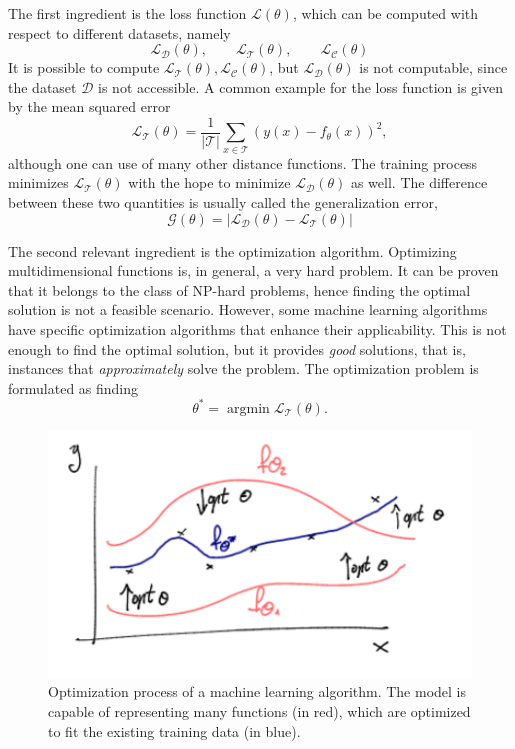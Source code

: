 \documentclass[]{report}
\begin{document}
The first ingredient is the loss function $\mathcal L(\theta)$, which can be computed with respect to different datasets, namely
\begin{equation}
    \mathcal L_{\mathcal D}(\theta), \qquad \mathcal L_{\mathcal T}(\theta), \qquad \mathcal L_{\mathcal C}(\theta)
\end{equation}
It is possible to compute $\mathcal L_{\mathcal T}(\theta), \mathcal L_{\mathcal C}(\theta)$, but $\mathcal L_{\mathcal D}(\theta)$ is not computable, since the dataset $\mathcal D$ is not accessible. A common example for the loss function is given by the mean squared error
\begin{equation}
    \mathcal L_{\mathcal T}(\theta) = \frac{1}{\vert \mathcal T \vert} \sum_{x \in \mathcal T} (y(x) - f_\theta(x))^2, 
\end{equation}
although one can use of many other distance functions. The training process minimizes $\mathcal L_{\mathcal T}(\theta)$ with the hope to minimize $\mathcal L_{\mathcal D}(\theta)$ as well. The difference between these two quantities is usually called the generalization error, 
\begin{equation}
    \mathcal G(\theta) = \left\vert \mathcal L_{\mathcal D}(\theta) - \mathcal L_{\mathcal T}(\theta) \right\vert
\end{equation}

The second relevant ingredient is the optimization algorithm. Optimizing multidimensional functions is, in general, a very hard problem. It can be proven that it belongs to the class of NP-hard problems, hence finding the optimal solution is not a feasible scenario. However, some machine learning algorithms have specific optimization algorithms that enhance their applicability. This is not enough to find the optimal solution, but it provides \textit{good} solutions, that is, instances that \textit{approximately} solve the problem. 
The optimization problem is formulated as finding
\begin{equation}
\theta^* = \operatorname{argmin} \mathcal L_{\mathcal T}(\theta).
\end{equation}

\begin{figure}
\centering
\includegraphics[width = .7\linewidth]{images/optimization}
\caption{Optimization process of a machine learning algorithm. The model is capable of representing many functions (in red), which are optimized to fit the existing training data (in blue). }
\label{fig.optimization}
\end{figure}
\end{document}
